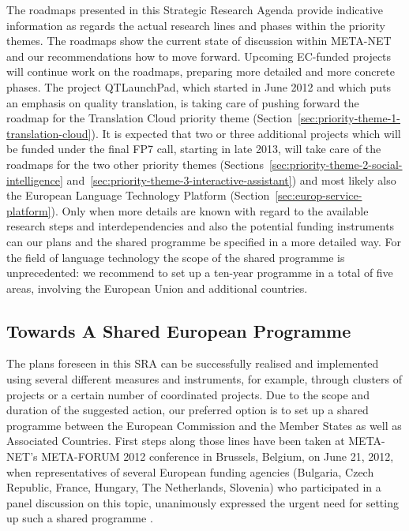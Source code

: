 \documentclass[10pt, plain]{../../metanetpaper}
\begin{document}
\begin{multicols}{2}
The roadmaps presented in this Strategic Research Agenda provide indicative information as regards the actual research lines and phases within the priority themes. The roadmaps show the current state of discussion within META-NET and our recommendations how to move forward. Upcoming EC-funded projects will continue work on the roadmaps, preparing more detailed and more concrete phases. The project QTLaunchPad, which started in June 2012 and which puts an emphasis on quality translation, is taking care of pushing forward the roadmap for the Translation Cloud priority theme (Section~\ref{sec:priority-theme-1-translation-cloud}). It is expected that two or three additional projects which will be funded under the final FP7 call, starting in late 2013, will take care of the roadmaps for the two other priority themes (Sections~\ref{sec:priority-theme-2-social-intelligence} and~\ref{sec:priority-theme-3-interactive-assistant}) and most likely also the European Language Technology Platform (Section~\ref{sec:europ-service-platform}). Only when more details are known with regard to the available research steps and interdependencies and also the potential funding instruments can our plans and the shared programme be specified in a more detailed way. For the field of language technology the scope of the shared programme is unprecedented: we recommend to set up a ten-year programme in a total of five areas, involving the European Union and additional countries.

\subsection{Towards A Shared European Programme}
\label{sec:towards-shar-europ}

The plans foreseen in this SRA can be successfully realised and implemented using several different measures and instruments, for example, through clusters of projects or a certain number of coordinated projects. Due to the scope and duration of the suggested action, our preferred option is to set up a shared programme between the European Commission and the Member States as well as Associated Countries. First steps along those lines have been taken at META-NET's META-FORUM 2012 conference in Brussels, Belgium, on June 21, 2012, when representatives of several European funding agencies (Bulgaria, Czech Republic, France, Hungary, The Netherlands, Slovenia) who participated in a panel discussion on this topic, unanimously expressed the urgent need for setting up such a shared programme \cite{mf2012}.


\end{multicols}
\end{document}
